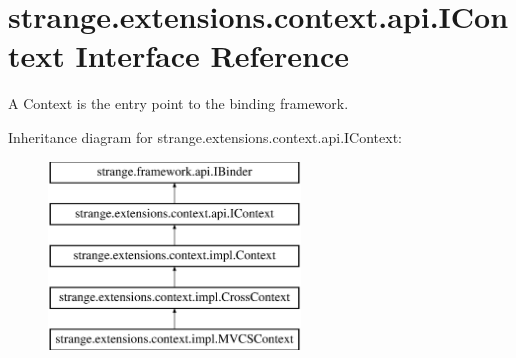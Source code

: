 \hypertarget{interfacestrange_1_1extensions_1_1context_1_1api_1_1_i_context}{\section{strange.\-extensions.\-context.\-api.\-I\-Context Interface Reference}
\label{interfacestrange_1_1extensions_1_1context_1_1api_1_1_i_context}
}


A Context is the entry point to the binding framework.  


Inheritance diagram for strange.\-extensions.\-context.\-api.\-I\-Context\-:\begin{figure}[H]
\begin{center}
\leavevmode
\includegraphics[height=5.000000cm]{interfacestrange_1_1extensions_1_1context_1_1api_1_1_i_context}
\end{center}
\end{figure}
